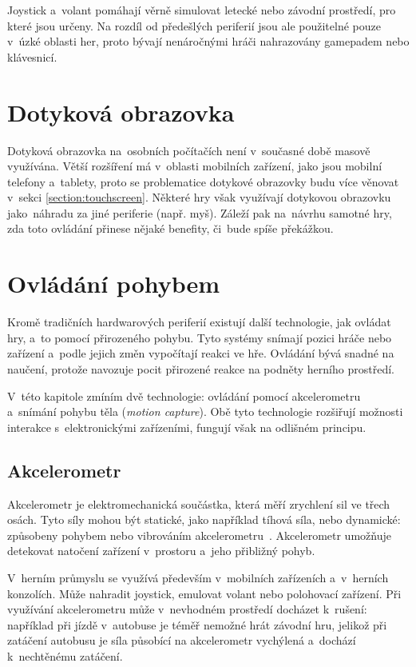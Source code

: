 \documentclass[thesis=B,czech,hidelinks]{FITthesis}[2012/06/26] %
\begin{document}
Joystick a~volant pomáhají věrně simulovat letecké nebo závodní prostředí, pro které jsou určeny. Na rozdíl od předešlých periferií jsou ale použitelné pouze v~úzké oblasti her, proto bývají nenáročnými hráči nahrazovány gamepadem nebo klávesnicí.

\section{Dotyková obrazovka}

Dotyková obrazovka na~osobních počítačích není v~současné době masově využívána. Větší rozšíření má v~oblasti mobilních zařízení, jako jsou mobilní telefony a~tablety, proto se problematice dotykové obrazovky budu více věnovat v~sekci \ref{section:touchscreen}. Některé hry však využívají dotykovou obrazovku jako~náhradu za jiné periferie (např. myš). Záleží pak na~návrhu samotné hry, zda toto ovládání přinese nějaké benefity, či~bude spíše překážkou.

\section{Ovládání pohybem}

Kromě tradičních hardwarových periferií existují další technologie, jak ovládat hry, a~to pomocí přirozeného pohybu. Tyto systémy snímají pozici hráče nebo zařízení a~podle jejich změn vypočítají reakci ve hře. Ovládání bývá snadné na naučení, protože navozuje pocit přirozené reakce na podněty herního prostředí.

V~této kapitole zmíním dvě technologie: ovládání pomocí akcelerometru a~snímání pohybu těla (\textit{motion capture}). Obě tyto technologie rozšiřují možnosti interakce s~elektronickými zařízeními, fungují však na odlišném principu.

\subsection{Akcelerometr}
\label{section:accelerometer}

Akcelerometr je elektromechanická součástka, která měří zrychlení sil ve třech osách. Tyto síly mohou být statické, jako například tíhová síla, nebo dynamické: způsobeny pohybem nebo vibrováním akcelerometru~\cite{acc}. Akcelerometr umožňuje detekovat natočení zařízení v~prostoru a~jeho přibližný pohyb.

V~herním průmyslu se využívá především v~mobilních zařízeních a~v~herních konzolích. Může nahradit joystick, emulovat volant nebo polohovací zařízení. Při využívání akcelerometru může v~nevhodném prostředí docházet k~rušení: například při jízdě v~autobuse je téměř nemožné hrát závodní hru, jelikož při zatáčení autobusu je síla působící na akcelerometr vychýlená a~dochází k~nechtěnému zatáčení.
\end{document}
